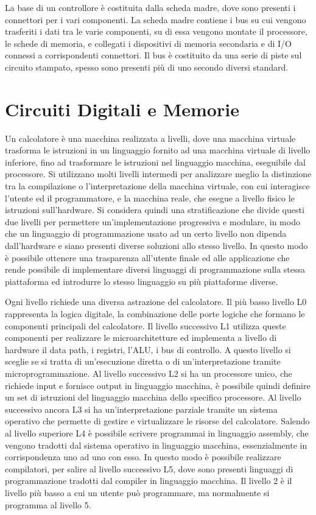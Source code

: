 \documentclass{article}
\numberwithin{equation}{subsection}
\begin{document}
La base di un controllore è costituita dalla scheda madre, dove sono presenti i connettori per i vari componenti. La scheda madre contiene i bus su cui vengono trasferiti i dati tra le varie componenti, su di essa 
vengono montate il processore, le schede di memoria, e collegati i dispositivi di memoria secondaria e di I/O connessi a corrispondenti connettori. Il bus è costituito da una serie di piste sul circuito stampato, 
spesso sono presenti più di uno secondo diversi standard. 

\clearpage

\section{Circuiti Digitali e Memorie}

Un calcolatore è una macchina realizzata a livelli, dove una macchina virtuale trasforma le istruzioni in un linguaggio fornito ad una macchina virtuale di livello inferiore, fino ad trasformare le istruzioni 
nel linguaggio macchina, eseguibile dal processore. Si utilizzano molti livelli intermedi per analizzare meglio la distinzione tra la compilazione o l'interpretazione della macchina virtuale, con cui interagisce 
l'utente ed il programmatore, e la macchina reale, che esegue a livello fisico le istruzioni sull'hardware. 
Si considera quindi una stratificazione che divide questi due livelli per permettere un'implementazione progressiva e modulare, in modo che un linguaggio di programmazione usato ad un certo livello non dipenda 
dall'hardware e siano presenti diverse soluzioni allo stesso livello. In questo modo è possibile ottenere una trasparenza all'utente finale ed alle applicazione che rende possibile di implementare diversi linguaggi 
di programmazione sulla stessa piattaforma ed introdurre lo stesso linguaggio su più piattaforme diverse. 


Ogni livello richiede una diversa astrazione del calcolatore. Il più basso livello L0 rappresenta la logica digitale, la combinazione delle porte logiche che formano le componenti principali del calcolatore. Il 
livello successivo L1 utilizza queste componenti per realizzare le microarchitetture ed implementa a livello di hardware il data path, i registri, l'ALU, i bus di controllo. A questo livello si sceglie se si 
tratta di un'esecuzione diretta o di un'interpretazione tramite microprogrammazione. Al livello successivo L2 si ha un processore unico, che richiede input e fornisce output in linguaggio macchina, è possibile 
quindi definire un set di istruzioni del linguaggio macchina dello specifico processore. Al livello successivo 
ancora L3 si ha un'interpretazione parziale tramite un sistema operativo che permette di gestire e virtualizzare le risorse del calcolatore. Salendo al livello superiore L4 è possibile scrivere programmai in 
linguaggio assembly, che vengono tradotti dal sistema operativo in linguaggio macchina, essenzialmente in corrispondenza uno ad uno con esso. In questo modo è possibile realizzare compilatori, per salire al livello 
successivo L5, dove sono presenti linguaggi di programmazione tradotti dal compiler in linguaggio macchina. Il livello 2 è il livello più basso a cui un utente può programmare, ma normalmente si programma 
al livello 5. 
\end{document}
